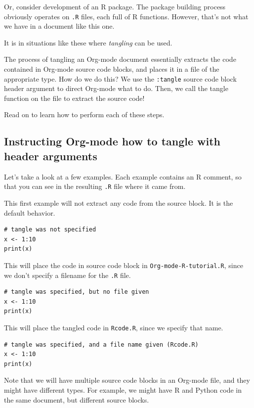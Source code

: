 \documentclass[11pt]{article}
\begin{document}
Or, consider development of an R package. The package building process obviously operates on \texttt{.R} files, each full of R functions. However, that's not what we have in a document like this one.

It is in situations like these where \emph{tangling} can be used. 

The process of tangling an Org-mode document essentially extracts the code contained in Org-mode source code blocks, and places it in a file of the appropriate type. How do we do this? We use the \texttt{:tangle} source code block header argument to direct Org-mode what to do. Then, we call the tangle function on the file to extract the source code!

Read on to learn how to perform each of these steps. 

\subsection*{Instructing Org-mode how to tangle with header arguments}
\label{sec-8-1}
Let's take a look at a few examples. Each example contains an R comment, so that you can see in the resulting \texttt{.R} file where it came from.

This first example will not extract any code from the source block. It is the default behavior. 

\begin{verbatim}
# tangle was not specified
x <- 1:10
print(x)
\end{verbatim}

This will place the code in source code block in \texttt{Org-mode-R-tutorial.R}, since we don't specify a filename for the \texttt{.R} file.

\begin{verbatim}
# tangle was specified, but no file given
x <- 1:10
print(x)
\end{verbatim}

This will place the tangled code in \texttt{Rcode.R}, since we specify that name. 

\begin{verbatim}
# tangle was specified, and a file name given (Rcode.R)
x <- 1:10
print(x)
\end{verbatim}

Note that we will have multiple source code blocks in an Org-mode file, and they might have different types. For example, we might have R and Python code in the same document, but different source blocks. 
\end{document}
